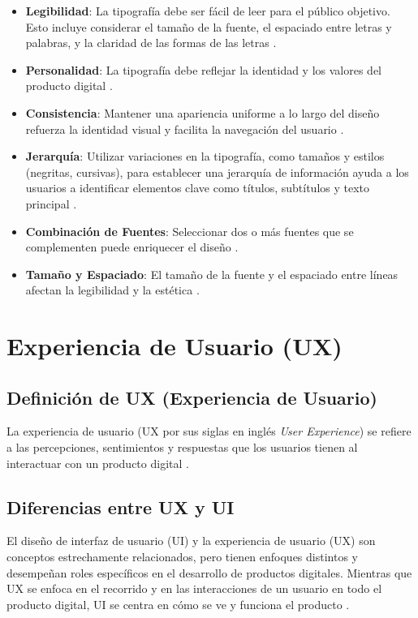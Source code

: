 \begin{itemize}
    \item \textbf{Legibilidad}: La tipografía debe ser fácil de leer para el público objetivo. Esto incluye considerar el tamaño de la fuente, el espaciado entre letras y palabras, y la claridad de las formas de las letras \cite{CamaraSevilla2023}.
    \item \textbf{Personalidad}: La tipografía debe reflejar la identidad y los valores del producto digital \cite{CamaraSevilla2023}.
    \item \textbf{Consistencia}: Mantener una apariencia uniforme a lo largo del diseño refuerza la identidad visual y facilita la navegación del usuario \cite{CamaraSevilla2023}.
    \item \textbf{Jerarquía}: Utilizar variaciones en la tipografía, como tamaños y estilos (negritas, cursivas), para establecer una jerarquía de información ayuda a los usuarios a identificar elementos clave como títulos, subtítulos y texto principal \cite{CamaraSevilla2023}.
    \item \textbf{Combinación de Fuentes}: Seleccionar dos o más fuentes que se complementen puede enriquecer el diseño \cite{CamaraSevilla2023}.
    \item \textbf{Tamaño y Espaciado}: El tamaño de la fuente y el espaciado entre líneas afectan la legibilidad y la estética \cite{CamaraSevilla2023}.
\end{itemize}

\section{Experiencia de Usuario (UX)}
\subsection{Definición de UX (Experiencia de Usuario)}
La experiencia de usuario (UX por sus siglas en inglés \textit{User Experience}) se refiere a las percepciones, sentimientos y respuestas que los usuarios tienen al interactuar con un producto digital \cite{Chacon2024}.

\subsection{Diferencias entre UX y UI}
El diseño de interfaz de usuario (UI) y la experiencia de usuario (UX) son conceptos estrechamente relacionados, pero tienen enfoques distintos y desempeñan roles específicos en el desarrollo de productos digitales. Mientras que UX se enfoca en el recorrido y en las interacciones de un usuario en todo el producto digital, UI se centra en cómo se ve y funciona el producto \cite{Chacon2024}.

